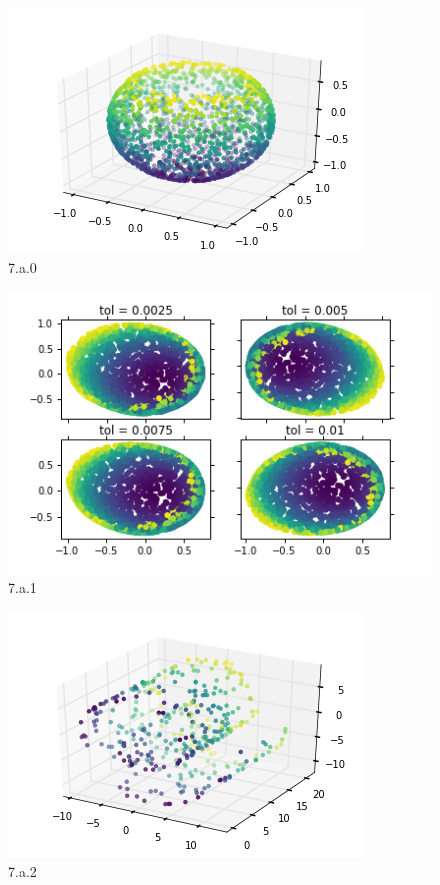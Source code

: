\documentclass[a4paper,11pt]{article}
\begin{document}
\begin{figure}[H]
  \includegraphics[width=\linewidth]{7_a_0.png}
  \caption{7.a.0}\label{fig:7_1}
\end{figure}
\begin{figure}[H]
  \includegraphics[width=\linewidth]{7_a_1.png}
  \caption{7.a.1}\label{fig:7_1}
\end{figure}
\begin{figure}[H]
  \includegraphics[width=\linewidth]{7_a_2.png}
  \caption{7.a.2}\label{fig:7_2}
\end{figure}
\end{document}
